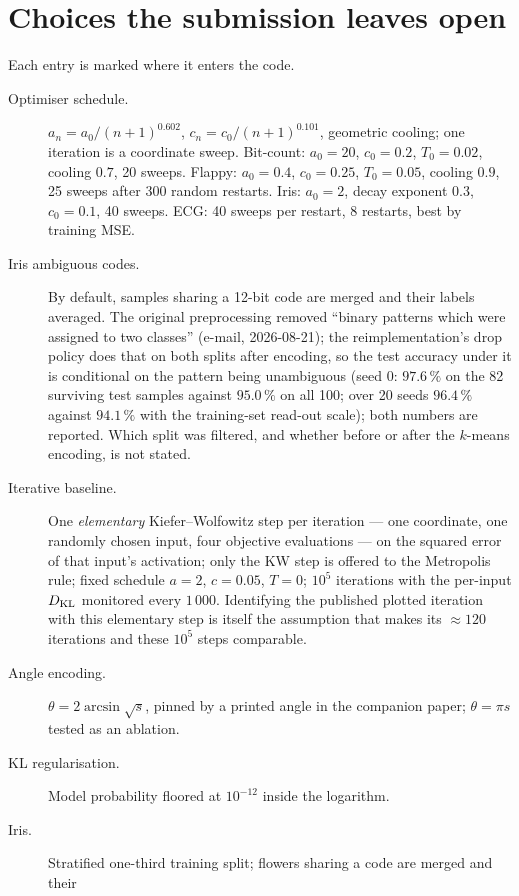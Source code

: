 \section{Choices the submission leaves open}
\label{app:assumptions}

Each entry is marked \code{[ASSUMPTION]} where it enters the code.

\begin{description}
\item[Optimiser schedule.]  $a_n=a_0/(n+1)^{0.602}$, $c_n=c_0/(n+1)^{0.101}$, geometric
cooling; one iteration is a coordinate sweep.  Bit-count: $a_0=20$, $c_0=0.2$, $T_0=0.02$,
cooling $0.7$, 20 sweeps.  Flappy: $a_0=0.4$, $c_0=0.25$, $T_0=0.05$, cooling $0.9$, 25 sweeps
after 300 random restarts.  Iris: $a_0=2$, decay exponent $0.3$, $c_0=0.1$, 40 sweeps.  ECG:
40 sweeps per restart, 8 restarts, best by training MSE.
\item[Iris ambiguous codes.]  By default, samples sharing a 12-bit code are merged and their
labels averaged.  The original preprocessing removed ``binary patterns which were assigned to
two classes'' (e-mail, 2026-08-21); the reimplementation's drop policy does that on both splits
after encoding, so the test accuracy under it is conditional on the pattern being unambiguous
(seed 0: $97.6\,\%$ on the 82 surviving test samples against $95.0\,\%$ on all 100; over 20
seeds $96.4\,\%$ against $94.1\,\%$ with the training-set read-out scale); both numbers are
reported.  Which split was filtered, and whether before or after the $k$-means encoding, is not
stated.
\item[Iterative baseline.]  One \emph{elementary} Kiefer--Wolfowitz step per iteration --- one
coordinate, one randomly chosen input, four objective evaluations --- on the squared error of
that input's activation; only the KW step is offered to the Metropolis rule; fixed schedule
$a=2$, $c=0.05$, $T=0$; $10^5$ iterations with the per-input $D_{\mathrm{KL}}$ monitored every $1\,000$.
Identifying the published plotted iteration with this elementary step is itself the assumption
that makes its $\approx120$ iterations and these $10^5$ steps comparable.
\item[Angle encoding.]  $\theta=2\arcsin\sqrt s$, pinned by a printed angle in the companion
paper; $\theta=\pi s$ tested as an ablation.
\item[KL regularisation.]  Model probability floored at $10^{-12}$ inside the logarithm.
\item[Iris.]  Stratified one-third training split; flowers sharing a code are merged and their

\end{description}
